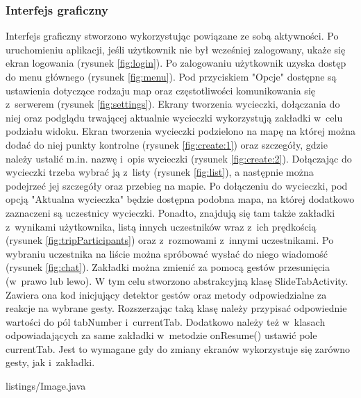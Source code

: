 \subsubsection{Interfejs graficzny}
Interfejs graficzny stworzono wykorzystując powiązane ze sobą aktywności. Po
uruchomieniu aplikacji, jeśli użytkownik nie był wcześniej zalogowany, ukaże się
ekran logowania (rysunek \ref{fig:login}). Po zalogowaniu użytkownik uzyska
dostęp do menu głównego (rysunek \ref{fig:menu}). Pod przyciskiem "Opcje"
dostępne są ustawienia dotyczące rodzaju map oraz częstotliwości komunikowania
się z~serwerem (rysunek \ref{fig:settings}). Ekrany tworzenia wycieczki,
dołączania do niej oraz podglądu trwającej aktualnie wycieczki wykorzystują
zakładki w~celu podziału widoku. Ekran tworzenia wycieczki podzielono na mapę na
której można dodać do niej punkty kontrolne (rysunek \ref{fig:create:1}) oraz
szczegóły, gdzie należy ustalić m.in. nazwę i~opis wycieczki (rysunek
\ref{fig:create:2}). Dołączając do wycieczki trzeba wybrać ją z~listy
(rysunek \ref{fig:list}), a następnie można podejrzeć jej szczegóły oraz
przebieg na mapie. Po dołączeniu do wycieczki, pod opcją "Aktualna wycieczka" będzie dostępna podobna mapa, na której dodatkowo zaznaczeni są uczestnicy
wycieczki. Ponadto, znajdują się tam także zakładki z~wynikami użytkownika, listą innych
uczestników wraz z~ich prędkością (rysunek \ref{fig:tripParticipants}) oraz
z~rozmowami z~innymi uczestnikami. Po wybraniu uczestnika na liście można spróbować wysłać do niego wiadomość (rysunek \ref{fig:chat}). 
Zakładki można zmienić za pomocą gestów przesunięcia (w~prawo lub lewo). W tym celu stworzono abstrakcyjną klasę SlideTabActivity. Zawiera ona kod inicjujący detektor gestów oraz metody odpowiedzialne za reakcje na wybrane gesty. Rozszerzając taką klasę należy przypisać odpowiednie wartości do pól tabNumber i~currentTab. Dodatkowo należy też w~klasach odpowiadających za same zakładki w~metodzie onResume() ustawić pole currentTab. Jest to wymagane gdy do zmiany ekranów wykorzystuje się zarówno gesty, jak i~zakładki.



{listings/Image.java}

